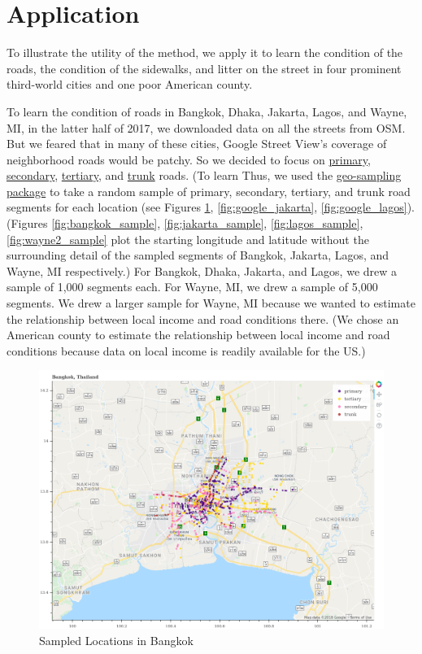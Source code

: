 \documentclass[12pt, letterpaper]{article}
\begin{document}
\section*{Application}

To illustrate the utility of the method, we apply it to learn the condition of the roads, the condition of the sidewalks, and litter on the street in four prominent third-world cities and one poor American county.

To learn the condition of roads in Bangkok, Dhaka, Jakarta, Lagos, and Wayne, MI, in the latter half of 2017, we downloaded data on all the streets from OSM. But we feared that in many of these cities, Google Street View's coverage of neighborhood roads would be patchy. So we decided to focus on \href{https://wiki.openstreetmap.org/wiki/Tag:highway=primary}{primary}, \href{https://wiki.openstreetmap.org/wiki/Tag:highway=secondary}{secondary}, \href{https://wiki.openstreetmap.org/wiki/Tag:highway=tertiary}{tertiary}, and \href{https://wiki.openstreetmap.org/wiki/Tag:highway=trunk}{trunk} roads. (To learn   Thus, we used the \href{https://github.com/geosensing/geo_sampling}{geo-sampling package} to take a random sample of primary, secondary, tertiary, and trunk road segments for each location (see Figures \ref{fig:google_bangkok}, \ref{fig:google_jakarta}, \ref{fig:google_lagos}). (Figures \ref{fig:bangkok_sample}, \ref{fig:jakarta_sample}, \ref{fig:lagos_sample}, \ref{fig:wayne2_sample} plot the starting longitude and latitude without the surrounding detail of the sampled segments of Bangkok, Jakarta, Lagos, and Wayne, MI respectively.) For Bangkok, Dhaka, Jakarta, and Lagos,  we drew a sample of 1,000 segments each. For Wayne, MI, we drew a sample of 5,000 segments. We drew a larger sample for Wayne, MI because we wanted to estimate the relationship between local income and road conditions there. (We chose an American county to estimate the relationship between local income and road conditions because data on local income is readily available for the US.)

\begin{figure}[H]
\centering
\caption{Sampled Locations in Bangkok} \label{fig:google_bangkok}
    \includegraphics[width=\textwidth]{../figs/bangkok-gmap.png}
\end{figure}
\end{document}
